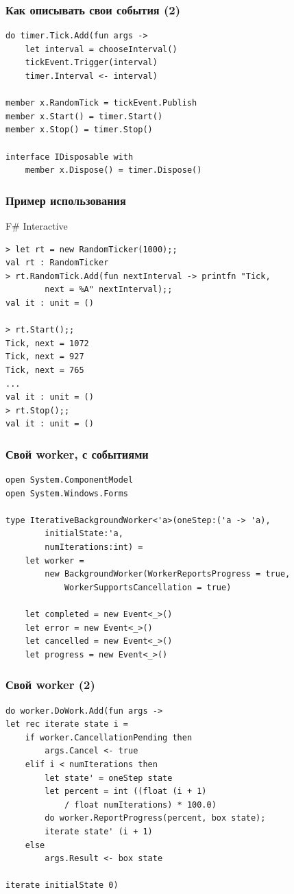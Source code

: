 \documentclass[xetex,mathserif,serif]{beamer}
\begin{document}
	\begin{frame}[fragile]
		\frametitle{Как описывать свои события (2)}
		\begin{verbatim}
do timer.Tick.Add(fun args ->
    let interval = chooseInterval()
    tickEvent.Trigger(interval)
    timer.Interval <- interval)

member x.RandomTick = tickEvent.Publish
member x.Start() = timer.Start()
member x.Stop() = timer.Stop()

interface IDisposable with
    member x.Dispose() = timer.Dispose()
		\end{verbatim}
	\end{frame}

	\begin{frame}[fragile]
		\frametitle{Пример использования}
		\begin{alertblock}{F\# Interactive}
			\begin{verbatim}
> let rt = new RandomTicker(1000);;
val rt : RandomTicker
> rt.RandomTick.Add(fun nextInterval -> printfn "Tick, 
        next = %A" nextInterval);;
val it : unit = ()

> rt.Start();;
Tick, next = 1072
Tick, next = 927
Tick, next = 765
...
val it : unit = ()
> rt.Stop();;
val it : unit = ()
			\end{verbatim}
		\end{alertblock}
	\end{frame}

	\begin{frame}[fragile]
		\frametitle{Свой worker, с событиями}
		\begin{verbatim}
open System.ComponentModel
open System.Windows.Forms

type IterativeBackgroundWorker<'a>(oneStep:('a -> 'a),
        initialState:'a,
        numIterations:int) =
    let worker =
        new BackgroundWorker(WorkerReportsProgress = true,
            WorkerSupportsCancellation = true)

    let completed = new Event<_>()
    let error = new Event<_>()
    let cancelled = new Event<_>()
    let progress = new Event<_>()
		\end{verbatim}
\end{frame}

	\begin{frame}[fragile]
		\frametitle{Свой worker (2)}
		\begin{verbatim}
do worker.DoWork.Add(fun args ->
let rec iterate state i =
    if worker.CancellationPending then
        args.Cancel <- true
    elif i < numIterations then
        let state' = oneStep state
        let percent = int ((float (i + 1) 
            / float numIterations) * 100.0)
        do worker.ReportProgress(percent, box state);
        iterate state' (i + 1)
    else
        args.Result <- box state

iterate initialState 0)
		\end{verbatim}
	\end{frame}
\end{document}
